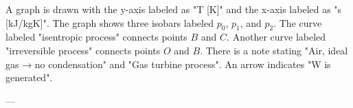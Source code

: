 A graph is drawn with the y-axis labeled as "T [K]" and the x-axis labeled as "s [kJ/kgK]". The graph shows three isobars labeled \( p_0 \), \( p_1 \), and \( p_2 \). The curve labeled "isentropic process" connects points \( B \) and \( C \). Another curve labeled "irreversible process" connects points \( O \) and \( B \). There is a note stating "Air, ideal gas → no condensation" and "Gas turbine process". An arrow indicates "W is generated".

---